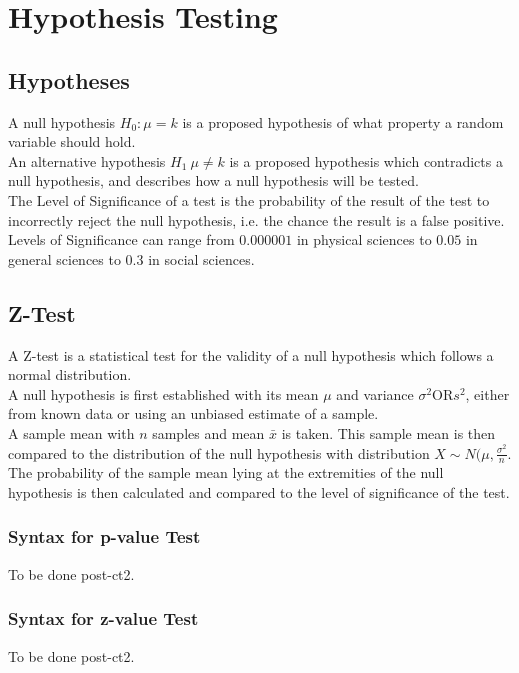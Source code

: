 \documentclass[../main]{subfiles}
\begin{document}
\section{Hypothesis Testing}

	\subsection{Hypotheses}

	A null hypothesis \(H_0 : \mu = k\) is a proposed hypothesis of what property a random variable should hold. \\

	An alternative hypothesis \(H_1\: \mu \neq k\) is a proposed hypothesis which contradicts a null hypothesis, and describes how a null hypothesis will be tested. \\

	The Level of Significance of a test is the probability of the result of the test to incorrectly reject the null hypothesis, i.e. the chance the result is a false positive. Levels of Significance can range from \(0.000001\) in physical sciences to \(0.05\) in general sciences to \(0.3\) in social sciences. \\

	\subsection{Z-Test}

	A Z-test is a statistical test for the validity of a null hypothesis which follows a normal distribution. \\

	A null hypothesis is first established with its mean \(\mu\) and variance \(\sigma^2 \text{OR} s^2\), either from known data or using an unbiased estimate of a sample. \\

	A sample mean with \(n\) samples and mean \(\bar{x}\) is taken. This sample mean is then compared to the distribution of the null hypothesis with distribution \(X \sim N(\mu,\frac{\sigma^2}{n}\). \\

	The probability of the sample mean lying at the extremities of the null hypothesis is then calculated and compared to the level of significance of the test. \\

	\subsubsection{Syntax for p-value Test}

	To be done post-ct2. \\

	\subsubsection{Syntax for z-value Test}

	To be done post-ct2. \\
\end{document}
